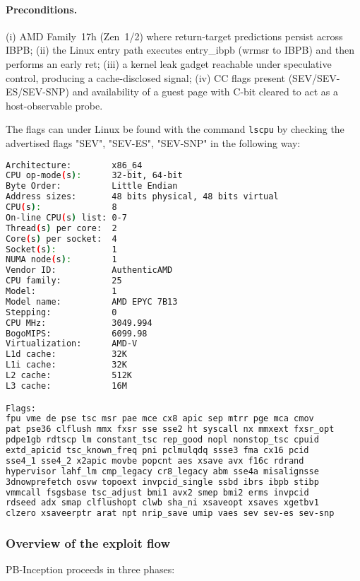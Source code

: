 \documentclass[11pt,a4paper]{article}
\begin{document}
\paragraph{Preconditions.}
(i) AMD Family~17h (Zen~1/2) where return-target predictions persist across IBPB; (ii) the Linux entry path executes entry\_ibpb (wrmsr to IBPB) and then performs an early ret; (iii) a kernel leak gadget reachable under speculative control, producing a cache-disclosed signal; (iv) CC flags present (SEV/SEV-ES/SEV-SNP) and availability of a guest page with C-bit cleared to act as a host-observable probe.%

The flags can under Linux be found with the command \texttt{lscpu} by checking the advertised flags "SEV", "SEV-ES", "SEV-SNP" in the following way:
\begin{lstlisting}[language=bash]
Architecture:        x86_64
CPU op-mode(s):      32-bit, 64-bit
Byte Order:          Little Endian
Address sizes:       48 bits physical, 48 bits virtual
CPU(s):              8
On-line CPU(s) list: 0-7
Thread(s) per core:  2
Core(s) per socket:  4
Socket(s):           1
NUMA node(s):        1
Vendor ID:           AuthenticAMD
CPU family:          25
Model:               1
Model name:          AMD EPYC 7B13
Stepping:            0
CPU MHz:             3049.994
BogoMIPS:            6099.98
Virtualization:      AMD-V
L1d cache:           32K
L1i cache:           32K
L2 cache:            512K
L3 cache:            16M

Flags:
fpu vme de pse tsc msr pae mce cx8 apic sep mtrr pge mca cmov 
pat pse36 clflush mmx fxsr sse sse2 ht syscall nx mmxext fxsr_opt 
pdpe1gb rdtscp lm constant_tsc rep_good nopl nonstop_tsc cpuid 
extd_apicid tsc_known_freq pni pclmulqdq ssse3 fma cx16 pcid 
sse4_1 sse4_2 x2apic movbe popcnt aes xsave avx f16c rdrand 
hypervisor lahf_lm cmp_legacy cr8_legacy abm sse4a misalignsse 
3dnowprefetch osvw topoext invpcid_single ssbd ibrs ibpb stibp 
vmmcall fsgsbase tsc_adjust bmi1 avx2 smep bmi2 erms invpcid 
rdseed adx smap clflushopt clwb sha_ni xsaveopt xsaves xgetbv1 
clzero xsaveerptr arat npt nrip_save umip vaes sev sev-es sev-snp
\end{lstlisting}

\subsubsection{Overview of the exploit flow}
\label{sec:method:pb-inception:overview}
PB-Inception proceeds in three phases:
\end{document}
